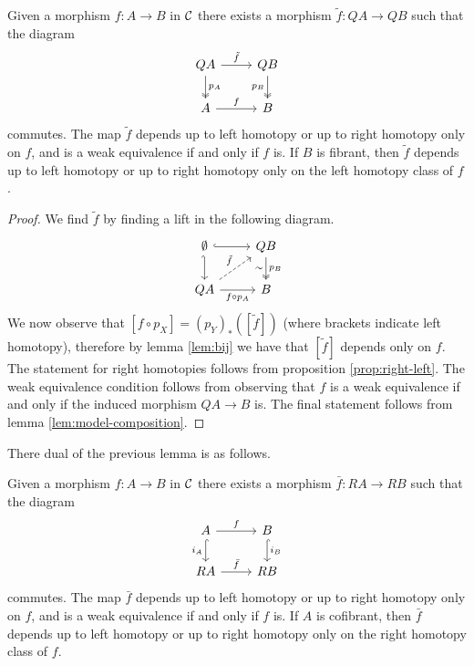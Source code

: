 \begin{proposition}
	Given a morphism $f \colon A \longrightarrow B$ in $\mathcal{C}$ there exists a morphism $\tilde{f} \colon QA \longrightarrow QB$ such that the diagram
	\[\begin{tikzcd}
		QA & QB \\
		A & B
		\arrow["\tilde{f}", from=1-1, to=1-2]
		\arrow["{p_A}", two heads, from=1-1, to=2-1]
		\arrow["{p_B}"', two heads, from=1-2, to=2-2]
		\arrow["f", from=2-1, to=2-2]
	\end{tikzcd}\]
	commutes. The map $\tilde{f}$ depends up to left homotopy or up to right homotopy only on $f$, and
	is a weak equivalence if and only if $f$ is. If $B$ is fibrant, then $\tilde{f}$ depends up to left
	homotopy or up to right homotopy only on the left homotopy class of $f$. 
\end{proposition}
\begin{proof}
	We find $\tilde{f}$ by finding a lift in the following diagram.
	\[\begin{tikzcd}
		\emptyset & QB \\
		QA & B
		\arrow[hook, from=1-1, to=1-2]
		\arrow[hook', from=1-1, to=2-1]
		\arrow["{p_B}", "\sim"', two heads, from=1-2, to=2-2]
		\arrow["{\tilde{f}}", dashed, from=2-1, to=1-2]
		\arrow["{f\circ p_A}"', from=2-1, to=2-2]
	\end{tikzcd}\]
	We now observe that $[f \circ p_X] = (p_Y)_*([\tilde{f}])$ (where brackets indicate left homotopy), therefore by lemma \ref{lem:bij} we have that $[\tilde{f}]$ depends only on $f$. The statement for right homotopies follows from proposition \ref{prop:right-left}. The weak  equivalence condition follows from observing that $f$ is a weak equivalence if and only if the induced morphism $QA \longrightarrow B$ is. The final statement follows from lemma \ref{lem:model-composition}.
\end{proof}

There dual of the previous lemma is as follows.

\begin{proposition}
	Given a morphism $f \colon A \longrightarrow B$ in $\mathcal{C}$ there exists a morphism $\bar{f} \colon RA \longrightarrow RB$ such that the diagram
	\[\begin{tikzcd}
		A & B \\
		RA & RB
		\arrow["f", from=1-1, to=1-2]
		\arrow["{i_A}"', hook, from=1-1, to=2-1]
		\arrow["{i_B}", hook, from=1-2, to=2-2]
		\arrow["{\bar{f}}", from=2-1, to=2-2]
	\end{tikzcd}\]
	commutes. The map $\bar{f}$ depends up to left homotopy or up to right homotopy only on $f$, and
	is a weak equivalence if and only if $f$ is. If $A$ is cofibrant, then $\bar{f}$ depends up to left
	homotopy or up to right homotopy only on the right homotopy class of $f$. 
\end{proposition}

